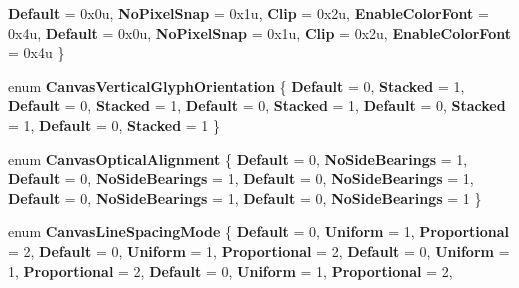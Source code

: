 \begin{DoxyCompactItemize}
{\bfseries Default} = 0x0u, 
{\bfseries No\+Pixel\+Snap} = 0x1u, 
{\bfseries Clip} = 0x2u, 
{\bfseries Enable\+Color\+Font} = 0x4u, 
\newline
{\bfseries Default} = 0x0u, 
{\bfseries No\+Pixel\+Snap} = 0x1u, 
{\bfseries Clip} = 0x2u, 
{\bfseries Enable\+Color\+Font} = 0x4u
 \}
\item 
\mbox{\label{namespace_microsoft_1_1_graphics_1_1_canvas_1_1_text_ac948f04f716279fad132d07892e44d18}} 
enum {\bfseries Canvas\+Vertical\+Glyph\+Orientation} \{ \newline
{\bfseries Default} = 0, 
{\bfseries Stacked} = 1, 
{\bfseries Default} = 0, 
{\bfseries Stacked} = 1, 
\newline
{\bfseries Default} = 0, 
{\bfseries Stacked} = 1, 
{\bfseries Default} = 0, 
{\bfseries Stacked} = 1, 
\newline
{\bfseries Default} = 0, 
{\bfseries Stacked} = 1
 \}
\item 
\mbox{\label{namespace_microsoft_1_1_graphics_1_1_canvas_1_1_text_aa1f89365afa2b2891e65edc60ec74cdd}} 
enum {\bfseries Canvas\+Optical\+Alignment} \{ \newline
{\bfseries Default} = 0, 
{\bfseries No\+Side\+Bearings} = 1, 
{\bfseries Default} = 0, 
{\bfseries No\+Side\+Bearings} = 1, 
\newline
{\bfseries Default} = 0, 
{\bfseries No\+Side\+Bearings} = 1, 
{\bfseries Default} = 0, 
{\bfseries No\+Side\+Bearings} = 1, 
\newline
{\bfseries Default} = 0, 
{\bfseries No\+Side\+Bearings} = 1
 \}
\item 
\mbox{\label{namespace_microsoft_1_1_graphics_1_1_canvas_1_1_text_a0af1601f34ce8114935e99af136dc8cc}} 
enum {\bfseries Canvas\+Line\+Spacing\+Mode} \{ \newline
{\bfseries Default} = 0, 
{\bfseries Uniform} = 1, 
{\bfseries Proportional} = 2, 
{\bfseries Default} = 0, 
\newline
{\bfseries Uniform} = 1, 
{\bfseries Proportional} = 2, 
{\bfseries Default} = 0, 
{\bfseries Uniform} = 1, 
\newline
{\bfseries Proportional} = 2, 
{\bfseries Default} = 0, 
{\bfseries Uniform} = 1, 
{\bfseries Proportional} = 2, 
\newline

\end{DoxyCompactItemize}
